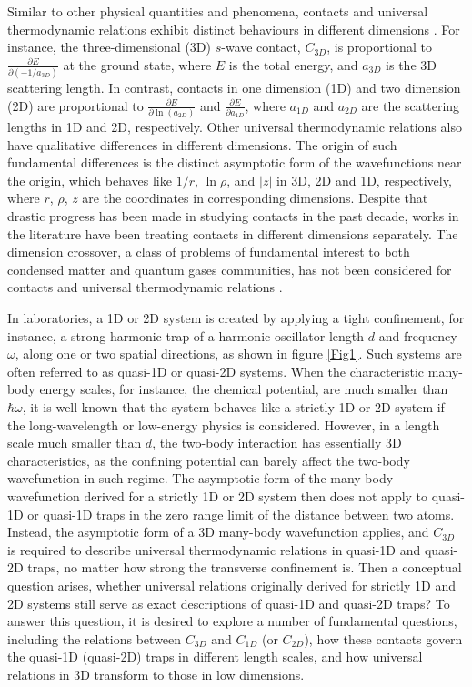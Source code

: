\documentclass[twocolumn, prl]{revtex4}
\begin{document}
Similar to other physical quantities and phenomena, contacts and universal thermodynamic relations exhibit distinct behaviours in different dimensions \cite{V3,V4,V5}. For instance, the three-dimensional (3D) $s$-wave contact, $C_{3D}$, is proportional to $\frac{\partial E}{\partial (-1/a_{3D})}$ at the ground state, where $E$ is the total energy, and $a_{3D}$ is the 3D scattering length. In contrast, contacts in one dimension (1D) and two dimension (2D) are proportional to $\frac{\partial E}{\partial \ln(a_{2D})}$ and $\frac{\partial E}{\partial a_{1D}}$, where $a_{1D}$ and $a_{2D}$ are the scattering lengths in 1D and 2D, respectively. Other universal thermodynamic relations also have qualitative differences in different dimensions. The origin of such fundamental differences is the distinct asymptotic form of the wavefunctions near the origin, which behaves like $1/r$, $\ln \rho$, and $|z|$ in 3D, 2D and 1D, respectively, where $r$, $\rho$, $z$ are the coordinates in corresponding dimensions. Despite that drastic progress has been made in studying contacts in the past decade, works in the literature have been treating contacts in different dimensions separately. The dimension crossover, a class of problems of fundamental interest to both condensed matter and quantum gases communities, has not been considered for contacts and universal thermodynamic relations \cite{Olshanii1,Ketterle,Olshanii2,Qin,Petrov}. 


In laboratories, a 1D or 2D system is created by applying a tight confinement, for instance, a strong harmonic trap of a harmonic oscillator length $d$ and frequency $\omega$, along one or two spatial directions, as shown in figure \ref{Fig1}. Such systems are often referred to as quasi-1D or quasi-2D systems. When the characteristic many-body energy scales, for instance, the chemical potential, are much smaller than $\hbar\omega$, it is well known that the system behaves like a strictly 1D or 2D system if the long-wavelength or low-energy physics is considered. However, in a length scale much smaller than $d$, the two-body interaction has essentially 3D characteristics, as the confining potential can barely affect the two-body wavefunction in such regime. The asymptotic form of the many-body wavefunction derived for a strictly 1D or 2D system then does not apply to quasi-1D or quasi-1D traps in the zero range limit of the distance between two atoms. Instead, the asymptotic form of a 3D many-body wavefunction applies, and $C_{3D}$ is required to describe universal thermodynamic relations in quasi-1D and quasi-2D traps, no matter how strong the transverse confinement is. Then a conceptual question arises, whether universal relations originally derived for strictly 1D and 2D systems still serve as exact descriptions of quasi-1D and quasi-2D traps?  To answer this question, it is desired to explore a number of fundamental questions, including the relations between $C_{3D}$ and $C_{1D}$ (or $C_{2D}$), how these contacts govern the quasi-1D (quasi-2D) traps in different length scales, and how universal relations in 3D transform to those in low dimensions.  
\end{document}
